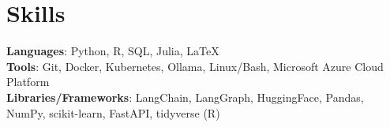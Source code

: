 \documentclass[letterpaper,11pt]{article}
\makeatletter
\newcommand{\resumeItem}[1]{
  \item\small{
    {#1 \vspace{-2pt}}
  }
}
\newcommand{\resumeProjectHeading}[2]{
    \item
    \begin{tabular*}{1.001\textwidth}{l@{\extracolsep{\fill}}r}
      \small#1 & \small #2\\
    \end{tabular*}\vspace{-7pt}
}
\newcommand{\resumeSubHeadingListStart}{\begin{itemize}[leftmargin=0.0in, label={}]}
\newcommand{\resumeSubHeadingListEnd}{\end{itemize}}
\newcommand{\resumeItemListStart}{\begin{itemize}}
\newcommand{\resumeItemListEnd}{\end{itemize}\vspace{-5pt}}
\makeatother
\begin{document}



\section{Skills}
  \begin{itemize}[leftmargin=0.15in, label={}]
      \small{\item{
      \textbf{Languages}{: Python, R, SQL, Julia, \LaTeX} \\
      \textbf{Tools}{: Git, Docker, Kubernetes, Ollama, Linux/Bash, Microsoft Azure Cloud Platform} \\
      \textbf{Libraries/Frameworks}{: LangChain, LangGraph, HuggingFace, Pandas, NumPy, scikit-learn, FastAPI, tidyverse (R)}  \\
      }}
  \end{itemize} 
\end{document}
